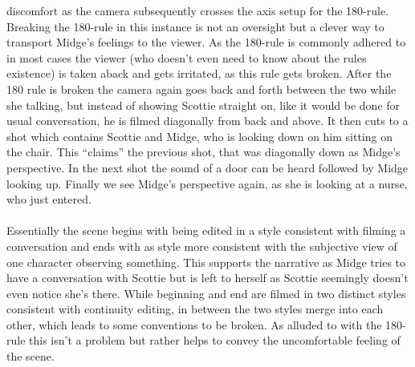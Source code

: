 \documentclass[fleqn,14pt]{article}
\begin{document}
discomfort as the camera subsequently crosses the axis setup for the 180-rule. Breaking the 180-rule in this instance is not an oversight but a clever way to transport Midge's feelings
to the viewer. As the 180-rule is commonly adhered to in most cases the viewer (who doesn't even need to know about the rules existence) is taken aback and gets irritated, as this rule 
gets broken. After the 180 rule is broken the camera again goes back and forth between the two while she talking, but instead of showing Scottie straight on, like it would be done for 
usual conversation, he is filmed diagonally from back and above. It then cuts to a shot which contains Scottie and Midge, who is looking down on him sitting on the chair. This “claims”
the previous shot, that was diagonally down as Midge's perspective. In the next shot the sound of a door can be heard followed by Midge looking up. Finally we see Midge's perspective again,
as she is looking at a nurse, who just entered.\\
\\
Essentially the scene begins with being edited in a style consistent with filming a conversation and ends with as style more
consistent with the subjective view of one character observing something. This supports  the narrative as Midge tries to have a conversation with Scottie but
is left to herself as Scottie seemingly doesn't even notice she's there. While beginning and end are filmed in two distinct styles consistent with continuity editing, in between the
two styles merge into each other, which leads to some conventions to be broken. As alluded to with the 180-rule this isn't a problem but rather helps to convey the uncomfortable feeling
of the scene.
\end{document}
